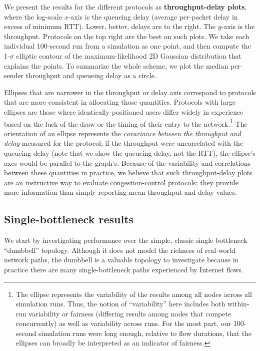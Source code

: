 We present the results for the different protocols as {\bf
  throughput-delay plots}, where the log-scale $x$-axis is the
queueing delay (average per-packet delay in excess of minimum
RTT). Lower, better, delays are to the right.  The $y$-axis is the
throughput. Protocols on the top right are the best on such
plots. We take each individual 100-second run from a simulation as one
point, and then compute the 1-$\sigma$ elliptic contour
of the maximum-likelihood 2D Gaussian distribution that explains the
points. To summarize the whole scheme, we plot the median per-sender
throughput and queueing delay as a circle.

Ellipses that are narrower in the throughput or delay axis correspond
to protocols that are more consistent in allocating those
quantities. Protocols with large ellipses are those where
identically-positioned users differ widely in experience based on the
luck of the draw or the timing of their entry to the
network.\footnote{The ellipse represents the variability of the
  results among all nodes across all simulation runs. Thus, the notion
  of ``variability'' here includes both within-run variability or
  fairness (differing results among nodes that compete
  concurrently) as well as variability across runs. For the most part, our
  100-second simulation runs were long enough, relative to flow
  durations, that the ellipses can broadly be interpreted as
  an indicator of fairness.} The orientation of an ellipse
represents the {\em covariance between the throughput and delay}
measured for the protocol; if the throughput were uncorrelated with
the queueing delay (note that we show the queueing delay, not the
RTT), the ellipse's axes would be parallel to the graph's.  Because of
the variability and correlations between these quantities in practice,
we believe that such throughput-delay plots are an instructive way to
evaluate congestion-control protocols; they provide more information
than simply reporting mean throughput and delay values.

\subsection{Single-bottleneck results}

We start by investigating performance over the simple, classic
single-bottleneck ``dumbbell'' topology.  Although it does not model
the richness of real-world network paths, the dumbbell is a valuable
topology to investigate because in practice there are many
single-bottleneck paths experienced by Internet flows.

